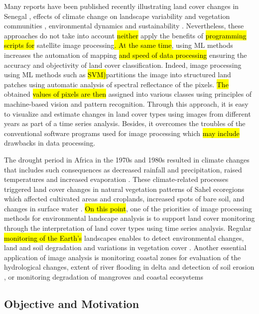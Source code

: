 \documentclass[earth,article,submit,pdftex,moreauthors]{Definitions/mdpi}
\begin{document}
{Many reports have been published recently illustrating} land cover changes in Senegal \cite{WOOD2004565,ELBERLING200337,Hiraldo}, effects of climate change on landscape variability and vegetation communities \cite{LIU2004583,TSCHAKERT2004535,LUFAFA20081}, environmental dynamics and sustainability \cite{CAMARA2017204}. {Nevertheless, these} approaches do not {take into account} \hl{neither} apply the {benefits} of \hl{programming scripts for} satellite image processing\hl{. At the same time}, using ML methods increases the automation of mapping \hl{and speed of data processing }ensuring the accuracy and objectivity of land cover classification. Indeed, image processing using {ML methods such as \hl{SVM)}}partitions the image into structured land patches using automatic analysis of spectral reflectance of the pixels{. \hl{The} obtained \hl{values of pixels are then }assigned }into various classes using principles of machine{-}based vision and pattern recognition. {Through this} approach, it {is easy} to {visualize} and estimate changes in land cover types using images {from} different years as {part of a} time series analysis. Besides, it overcomes the {troubles} of the {conventional software programs} used for image processing which \hl{may include} drawbacks {in} data processing.

The drought period in Africa in the 1970s and 1980s resulted in climate changes{ that includes }such consequences as decreased rainfall and precipitation, raised temperatures and increased evaporation \cite{Paturel,Lemenkova202217}. {These climate-related} processes triggered land cover changes in natural vegetation patterns of Sahel ecoregions which affected cultivated areas and croplands, increased spots of bare soil, and changes in surface water \cite{Fritz,Lemenkova202313}. \hl{On this point}, one of the priorities of image processing methods {for environmental landscape analysis }is to support {land cover} monitoring through {the} interpretation of land cover types using time series analysis{. Regular \hl{monitoring of the Earth's }landscapes }enables to detect environmental changes, land and soil degradation and variations in vegetation cover \cite{MBOW2008210}. Another essential application of image analysis is monitoring coastal zones for {evaluation of} the hydrological changes, extent of river flooding in delta and detection {of soil }erosion \cite{NDOUR201892,NGOM201634}, or monitoring degradation of mangroves and coastal ecosystems \cite{LOMBARD2023102027,CARNEY2014126}

\subsection{Objective and Motivation}
\end{document}
